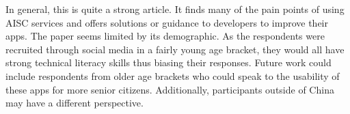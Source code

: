 \documentclass[a4paper]{article}
\begin{document}
In general, this is quite a strong article. It finds many of the pain points of using AISC services and offers solutions or guidance to developers to improve their apps. The paper seems limited by its demographic. As the respondents were recruited through social media in a fairly young age bracket, they would all have strong technical literacy skills thus biasing their responses. Future work could include respondents from older age brackets who could speak to the usability of these apps for more senior citizens. Additionally, participants outside of China may have a different perspective.


\newpage


\end{document}
